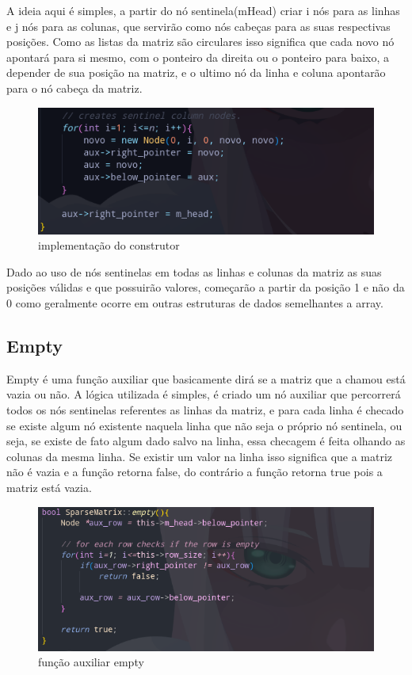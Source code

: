\documentclass[a4paper,12pt]{article}
\begin{document}
A ideia aqui é simples, a partir do nó sentinela(mHead) criar i nós para as linhas e j nós para as colunas, que servirão como nós cabeças para as suas respectivas posições.
Como as listas da matriz são circulares isso significa que cada novo nó apontará para si mesmo, com o ponteiro da direita ou o ponteiro para baixo, a depender de sua posição na matriz, e o ultimo nó da linha e coluna apontarão para o nó cabeça da matriz.

\begin{figure}[h]
\centering
\includegraphics[width=1\textwidth]{Imagens/sparsematrixCPP/sparsematrix-construtor-pt2.png}
\caption{\label{fig:construtor}implementação do construtor}
\end{figure}

Dado ao uso de nós sentinelas em todas as linhas e colunas da matriz as suas posições válidas e que possuirão valores, começarão a partir da posição 1 e não da 0 como geralmente ocorre em outras estruturas de dados semelhantes a array.

\subsection{Empty}
Empty é uma função auxiliar que basicamente dirá se a matriz que a chamou está vazia ou não.
A lógica utilizada é simples, é criado um nó auxiliar que percorrerá todos os nós sentinelas referentes as linhas da matriz, e para cada linha é checado se existe algum nó existente naquela linha que não seja o próprio nó sentinela, ou seja, se existe de fato algum dado salvo na linha, essa checagem é feita olhando as colunas da mesma linha.
Se existir um valor na linha isso significa que a matriz não é vazia e a função retorna false, do contrário a função retorna true pois a matriz está vazia. 

\begin{figure}[h]
\centering
\includegraphics[width=1\textwidth]{Imagens/sparsematrixCPP/empty.png}
\caption{\label{fig:empty} função auxiliar empty}
\end{figure}
\end{document}
